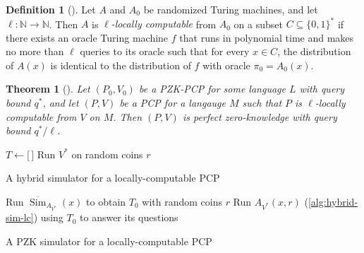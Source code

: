 \documentclass[english,12pt]{reedthesis}
\theoremstyle{plain}
\newtheorem{thm}{Theorem}[section]
\theoremstyle{definition}
\newtheorem{defn}[defn]{Definition}
\theoremstyle{remark}
\DeclareMathOperator{\Sim}{Sim}
\begin{document}
\begin{defn}[{\cite[Def.\ 3.1]{GOS25}}]\label{def:loc-comp}%
  Let $A$ and $A_{0}$ be randomized Turing machines, and let $\ell: \mathbb{N} \rightarrow \mathbb{N}$. Then
  $A$ is \emph{$\ell$-locally computable} from $A_{0}$ on a subset
  $C \subseteq \{0, 1\}^{*}$ if there exists an oracle Turing machine $f$ that runs in
  polynomial time and makes no more than $\ell$ queries to its oracle such that for
  every $x \in C$, the distribution of $A(x)$ is identical to the distribution of
  $f$ with oracle $\pi_{0} = A_{0}(x)$.
\end{defn}


\begin{thm}[{\cite[Lemma 3.2]{GOS25}}]\label{thm:local-comp-pzk}
  Let $(P_{0}, V_{0})$ be a PZK-PCP for some language $L$ with query bound
  $q^{*}$, and let $(P, V)$ be a PCP for a langauge $M$ such that $P$ is
  $\ell$-locally computable from $V$ on $M$. Then $(P, V)$ is perfect
  zero-knowledge with query bound $q^{*}/\ell$.
\end{thm}

\begin{algorithm}[htbp]
  $T \leftarrow \lbrack\,\rbrack$\;
  Run $V^{*}$ on random coins $r$\;
  \;
  \caption{A hybrid simulator for a locally-computable PCP~\cite[Construction
    3.3]{GOS25}}\label{alg:hybrid-sim-lc}
\end{algorithm}

\begin{algorithm}[htbp]
  Run $\overline{\Sim}_{A_{V^{*}}}(x)$ to obtain $T_{0}$ with random coins $r$\;
  Run $A_{V^{*}}(x, r)$ (\cref{alg:hybrid-sim-lc}) using $T_{0}$ to answer its
  questions\;
  \;
  \caption{A PZK simulator for a locally-computable PCP~\cite[Construction
    3.4]{GOS25}}\label{alg:pzk-sim-lc}
\end{algorithm}
\end{document}
